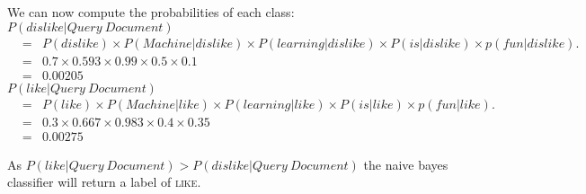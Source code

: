 \documentclass[--SOLUTION-OPTION--]{ditpaper}
\begin{document}
\begin{answer}
We can now compute the probabilities of each class:\\

$P(dislike|Query~Document)$
			\begin{eqnarray*}
&=& P(dislike) \times P(Machine|dislike) \times P(learning|dislike) \times P(is|dislike) \times p(fun|dislike).\\
&=& 0.7 \times 0.593 \times 0.99 \times 0.5 \times 0.1\\
&=& 0.00205
			\end{eqnarray*}
$P(like|Query~Document)$
			\begin{eqnarray*}
&=& P(like) \times P(Machine|like) \times P(learning|like) \times P(is|like) \times p(fun|like).\\
&=& 0.3 \times 0.667 \times 0.983 \times 0.4 \times 0.35\\
&=& 0.00275
			\end{eqnarray*}
			
As $P(like|Query~Document) > P(dislike|Query~Document)$ the naive bayes classifier will return a label of \textsc{like}.
		\end{answer}
%
\newpage
\clearpage

\end{document}

